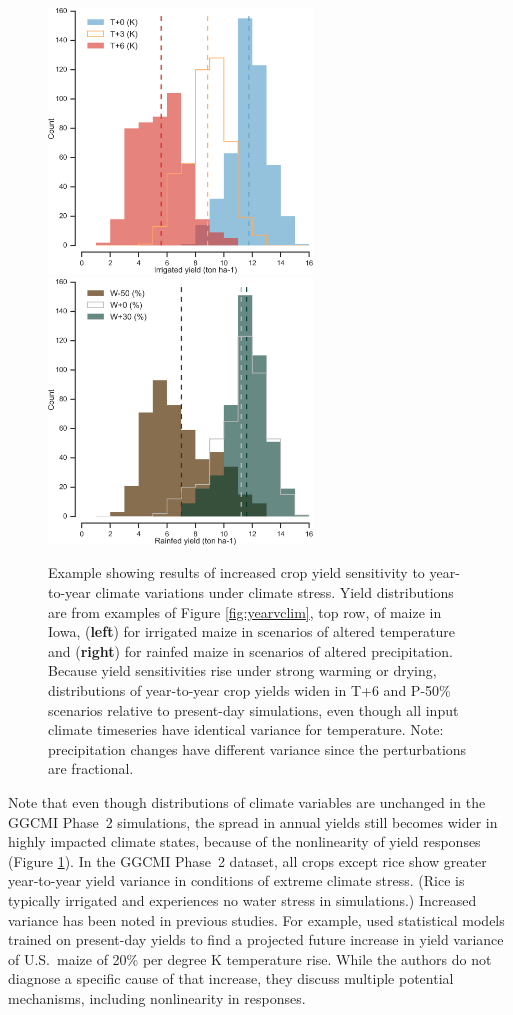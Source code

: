 \documentclass[gmdd]{copernicus} %
\begin{document}
\begin{figure}[ht]
\centering
   \includegraphics[width=7cm]{figures/hist_year_t.png} \hspace{10mm} \includegraphics[width=7cm]{figures/hist_year_pr.png}
   \caption{
   Example showing results of increased crop yield sensitivity to year-to-year climate variations under climate stress. 
   Yield distributions are from examples of Figure \ref{fig:yearvclim}, top row, of maize in Iowa, (\textbf{left}) for irrigated maize in scenarios of altered temperature and (\textbf{right}) for rainfed maize in scenarios of altered precipitation.
   Because yield sensitivities rise under strong warming or drying, distributions of year-to-year crop yields widen in T+6  and P-50\% scenarios relative to present-day simulations, even though all input climate timeseries have identical variance for temperature. Note: precipitation changes have different variance since the perturbations are fractional.  
    }
   \label{fig:yearly}
\end{figure}

Note that even though distributions of climate variables are unchanged in the GGCMI Phase~2 simulations, the spread in annual yields still becomes wider in highly impacted climate states, because of the nonlinearity of yield responses (Figure \ref{fig:yearly}). 
In the GGCMI Phase~2 dataset, all crops except rice show  greater year-to-year yield variance in conditions of extreme climate stress.
(Rice is typically irrigated and experiences no water stress in simulations.) 
Increased variance has been noted in previous studies. 
For example, \citet{Urban2012} used statistical models trained on present-day yields to find a projected future increase in yield variance of U.S.\ maize of 20\% per degree K temperature rise. While the authors do not diagnose a specific cause of that increase, they discuss multiple potential mechanisms, including nonlinearity in responses. 
\end{document}
